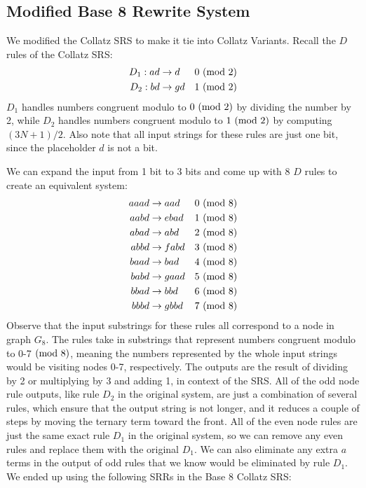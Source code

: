 \subsection{Modified Base 8 Rewrite System} \label{subsec:base8rewrite}
We modified the Collatz SRS to make it tie into Collatz Variants. Recall the $D$ rules of the Collatz SRS:
\begin{align*}
    D_1: ad &\rightarrow d &\text{$0\ (\mathrm{mod}\ 2)$}\\
    D_2: bd &\rightarrow gd &\text{$1\ (\mathrm{mod}\ 2)$}\\
\end{align*}
$D_1$ handles numbers congruent modulo to $0 \ (\mathrm{mod}\ 2)$ by dividing the number by 2, while $D_2$ handles numbers congruent modulo to $1 \ (\mathrm{mod}\ 2)$  by computing $(3N+1)/2$. Also note that all input strings for these rules are just one bit, since the placeholder $d$ is not a bit.\par
We can expand the input from 1 bit to 3 bits and come up with 8 $D$ rules to create an equivalent system:
\begin{align*}
    aaad &\rightarrow aad &\text{$0\ (\mathrm{mod}\ 8)$}\\
    aabd &\rightarrow ebad &\text{$1\ (\mathrm{mod}\ 8)$}\\
    abad &\rightarrow abd &\text{$2\ (\mathrm{mod}\ 8)$}\\
    abbd &\rightarrow fabd &\text{$3\ (\mathrm{mod}\ 8)$}\\
    baad &\rightarrow bad &\text{$4\ (\mathrm{mod}\ 8)$}\\
    babd &\rightarrow gaad &\text{$5\ (\mathrm{mod}\ 8)$}\\
    bbad &\rightarrow bbd &\text{$6\ (\mathrm{mod}\ 8)$}\\
    bbbd &\rightarrow gbbd &\text{$7\ (\mathrm{mod}\ 8)$}
\end{align*}
Observe that the input substrings for these rules all correspond to a node in graph $G_8$. The rules take in substrings that represent numbers congruent modulo to 0-7$\ (\mathrm{mod}\ 8)$, meaning the numbers represented by the whole input strings would be visiting nodes 0-7, respectively. The outputs are the result of dividing by 2 or multiplying by 3 and adding 1, in context of the SRS. All of the odd node rule outputs, like rule $D_2$ in the original system, are just a combination of several rules, which ensure that the output string is not longer, and it reduces a couple of steps by moving the ternary term toward the front. All of the even node rules are just the same exact rule $D_1$ in the original system, so we can remove any even rules and replace them with the original $D_1$. We can also eliminate any extra $a$ terms in the output of odd rules that we know would be eliminated by rule $D_1$. We ended up using the following SRRs in the Base 8 Collatz SRS:
